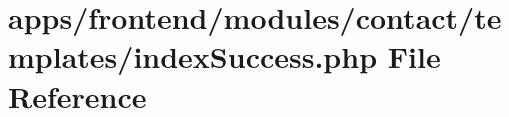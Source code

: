\hypertarget{frontend_2modules_2contact_2templates_2index_success_8php}{\section{apps/frontend/modules/contact/templates/index\-Success.php File Reference}
\label{frontend_2modules_2contact_2templates_2index_success_8php}
}
